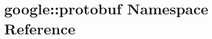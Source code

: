 \hypertarget{namespacegoogle_1_1protobuf}{\section{google\-:\-:protobuf Namespace Reference}
\label{namespacegoogle_1_1protobuf}
}
